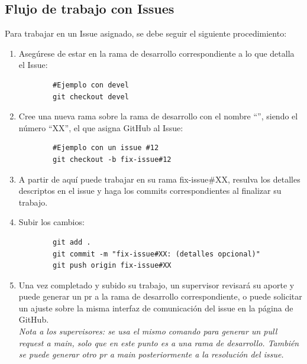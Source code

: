 \documentclass[a4paper]{article}
\begin{document}
\subsection{Flujo de trabajo con Issues}

\indent Para trabajar en un Issue asignado, se debe seguir el siguiente procedimiento: \\

\begin{enumerate}
    \item Asegúrese de estar en la rama de desarrollo correspondiente a lo que detalla el Issue:
    \begin{lstlisting}
        #Ejemplo con devel
        git checkout devel
    \end{lstlisting}

\item Cree una nueva rama sobre la rama de desarrollo con el nombre ``'', siendo el número ``XX'', el que asigna GitHub al Issue:

    \begin{lstlisting}
        #Ejemplo con un issue #12
        git checkout -b fix-issue#12
    \end{lstlisting}

\item A partir de aquí puede trabajar en su rama fix-issue\#XX, resulva los detalles descriptos en el issue y haga los commits correspondientes al finalizar su trabajo. \\

\item Subir los cambios: 

    \begin{lstlisting}
        git add .
        git commit -m "fix-issue#XX: (detalles opcional)"
        git push origin fix-issue#XX
    \end{lstlisting}

\item Una vez completado y subido su trabajo, un supervisor revisará su aporte y puede generar un pr a la rama de desarrollo correspondiente, o puede solicitar un ajuste sobre la misma interfaz de comunicación del issue en la página de GitHub.\\

    \textit{Nota a los supervisores: se usa el mismo comando para generar un pull request a main, solo que en este punto es a una rama de desarrollo. También se puede generar otro pr a main posteriormente a la resolución del issue.}


\end{enumerate}
\end{document}

